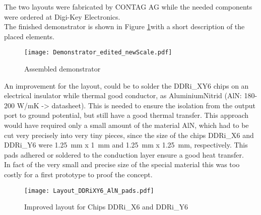 
The two layouts were fabricated by CONTAG AG while the needed components were ordered at Digi-Key Electronics.\\
The finished demonstrator is shown in Figure \ref{fig:assembledDemonstrator}with a short description of the placed elements.

\begin{figure}[htb!]
	\centering
  \texttt{[image: Demonstrator\_edited\_newScale.pdf]}
	\caption{Assembled demonstrator}
	\label{fig:assembledDemonstrator}
\end{figure}


\newpage
An improvement for the layout, could be to solder the DDRi\_XY6 chips on an electrical insulator while thermal good conductor, as AluminiumNitrid (AlN: 180-200 W/mK -> datasheet). 
This is needed to ensure the isolation from the output port to ground potential, but still have a good thermal transfer.
This approach would have required only a small amount of the material AlN, which had to be cut very precisely into very tiny pieces, since the size of the chips DDRi\_X6 and DDRi\_Y6 were \SI{1.25}{\milli \meter} x \SI{1}{\milli \meter} and \SI{1.25}{\milli \meter} x \SI{1.25}{\milli \meter}, respectively.
This pads adhered or soldered to the conduction layer ensure a good heat transfer. \\
In fact of the very small and precise size of the special material this was too costly for a first prototype to proof the concept.


\begin{figure}[htb!]
	\centering
  \texttt{[image: Layout\_DDRiXY6\_AlN\_pads.pdf]}
	\caption{Improved layout for Chips DDRi\_X6 and DDRi\_Y6}
	\label{fig:DDRiXY6AlNpads}
\end{figure}